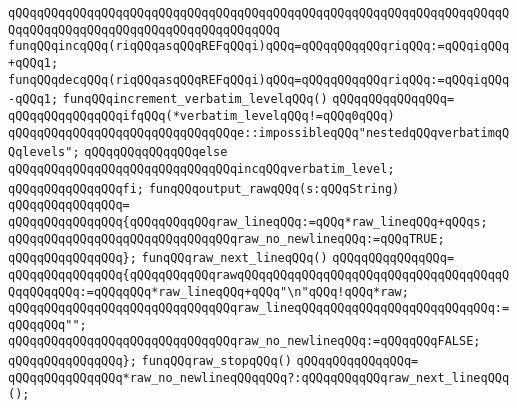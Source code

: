 \verb|qQQqqQQqqQQqqQQqqQQqqQQqqQQqqQQqqQQqqQQqqQQqqQQqqQQqqQQqqQQqqQQqqQQqqQQqqQQqqQQqqQQqqQQqqQQqqQQqqQQqqQQqqQQq|\newline
\verb|funqQQqincqQQq(riqQQqasqQQqREFqQQqi)qQQq=qQQqqQQqqQQqriqQQq:=qQQqiqQQq+qQQq1;|\newline
\verb|funqQQqdecqQQq(riqQQqasqQQqREFqQQqi)qQQq=qQQqqQQqqQQqriqQQq:=qQQqiqQQq-qQQq1;|\newline
\newline
\verb|funqQQqincrement_verbatim_levelqQQq()|\newline
\verb|qQQqqQQqqQQqqQQq=|\newline
\verb|qQQqqQQqqQQqqQQqifqQQq(*verbatim_levelqQQq!=qQQq0qQQq)|\newline
\verb|qQQqqQQqqQQqqQQqqQQqqQQqqQQqqQQqe::impossibleqQQq"nestedqQQqverbatimqQQqlevels";|\newline
\verb|qQQqqQQqqQQqqQQqelse|\newline
\verb|qQQqqQQqqQQqqQQqqQQqqQQqqQQqqQQqincqQQqverbatim_level;|\newline
\verb|qQQqqQQqqQQqqQQqfi;|\newline
\newline
\verb|funqQQqoutput_rawqQQq(s:qQQqString)|\newline
\verb|qQQqqQQqqQQqqQQq=|\newline
\verb|qQQqqQQqqQQqqQQq{qQQqqQQqqQQqraw_lineqQQq:=qQQq*raw_lineqQQq+qQQqs;|\newline
\verb|qQQqqQQqqQQqqQQqqQQqqQQqqQQqqQQqraw_no_newlineqQQq:=qQQqTRUE;|\newline
\verb|qQQqqQQqqQQqqQQq};|\newline
\newline
\verb|funqQQqraw_next_lineqQQq()|\newline
\verb|qQQqqQQqqQQqqQQq=|\newline
\verb|qQQqqQQqqQQqqQQq{qQQqqQQqqQQqrawqQQqqQQqqQQqqQQqqQQqqQQqqQQqqQQqqQQqqQQqqQQqqQQq:=qQQqqQQq*raw_lineqQQq+qQQq"\n"qQQq!qQQq*raw;|\newline
\verb|qQQqqQQqqQQqqQQqqQQqqQQqqQQqqQQqraw_lineqQQqqQQqqQQqqQQqqQQqqQQqqQQq:=qQQqqQQq"";|\newline
\verb|qQQqqQQqqQQqqQQqqQQqqQQqqQQqqQQqraw_no_newlineqQQq:=qQQqqQQqFALSE;|\newline
\verb|qQQqqQQqqQQqqQQq};|\newline
\newline
\verb|funqQQqraw_stopqQQq()|\newline
\verb|qQQqqQQqqQQqqQQq=|\newline
\verb|qQQqqQQqqQQqqQQq*raw_no_newlineqQQqqQQq?:qQQqqQQqqQQqraw_next_lineqQQq();|\newline
